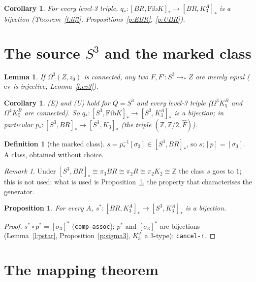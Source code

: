 \documentclass[11pt]{amsart}
\newtheorem{proposition}[theorem]{Proposition}
\newtheorem{lemma}[theorem]{Lemma}
\newtheorem{corollary}[theorem]{Corollary}
\theoremstyle{definition}
\newtheorem{definition}[theorem]{Definition}
\theoremstyle{remark}
\newtheorem{remark}[theorem]{Remark}
\newcommand{\Om}{\Omega}
\newcommand{\Z}{\mathbb{Z}}
\newcommand{\code}[1]{\texttt{#1}}
\newcommand{\hc}[2]{[#1,#2]_*}
\newcommand{\Fib}{\mathrm{Fib}}
\newcommand{\cls}[1]{[#1]}
\newcommand{\Fh}{\hat F}
\begin{document}
\begin{corollary}\label{c:qBR}
For every level-3 triple, $q_*:\hc{BR}{\Fib K}\to\hc{BR}{K^A_3}$ is a bijection
(Theorem~\ref{t:lift}, Propositions~\ref{p:EBR}, \ref{p:UBR}).
\end{corollary}

\section{The source $S^3$ and the marked class}

\begin{lemma}\label{l:s3paths}
If $\Om^3(Z,z_0)$ is connected, any two $F,F':S^3\to_*Z$ are merely equal
($\mathrm{ev}$ is injective, Lemma~\ref{l:ev3}).
\end{lemma}

\begin{corollary}\label{c:qS}
(E) and (U) hold for $Q=S^3$ and every level-3 triple ($\Om^3K^B_5$ and
$\Om^4K^B_5$ are connected). So $q_*:\hc{S^3}{\Fib K}\to\hc{S^3}{K^A_3}$ is a
bijection; in particular $p_*:\hc{S^3}{BR}\to\hc{S^3}{K_3}$ (the triple
$(\Z,\Z/2,\Fh)$).
\end{corollary}

\begin{definition}[the marked class]\label{d:s}
$s=p_*^{-1}\cls{\sigma_3}\in\hc{S^3}{BR}$, so $s;\cls p=\cls{\sigma_3}$. A
class, obtained without choice.
\end{definition}

\begin{remark}
Under $\hc{S^3}{BR}\cong\pi_3BR\cong\pi_2R\cong\pi_2K_2\cong\Z$ the class $s$ goes
to $1$; this is not used: what is used is Proposition~\ref{p:right}, the
property that characterises the generator.
\end{remark}

\begin{proposition}\label{p:right}
For every $A$, $s^*:\hc{BR}{K^A_3}\to\hc{S^3}{K^A_3}$ is a bijection.
\end{proposition}
\begin{proof}
$s^*\circ p^*=\cls{\sigma_3}^*$ (\code{comp-assoc}); $p^*$ and
$\cls{\sigma_3}^*$ are bijections (Lemma~\ref{l:pstar},
Proposition~\ref{p:sigma3}, $K^A_3$ a 3-type); \code{cancel-r}.
\end{proof}

\section{The mapping theorem}
\end{document}
